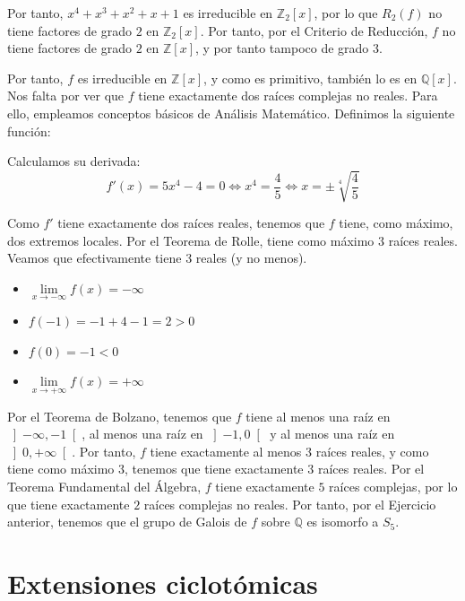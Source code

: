 \begin{ejercicio}
\begin{itemize}
        Por tanto, $x^4+x^3+x^2+x+1$ es irreducible en $\mathbb{Z}_2[x]$, por lo que $R_2(f)$ no tiene factores de grado $2$ en $\mathbb{Z}_2[x]$. Por tanto, por el Criterio de Reducción, $f$ no tiene factores de grado $2$ en $\mathbb{Z}[x]$, y por tanto tampoco de grado $3$.
    \end{itemize}

    Por tanto, $f$ es irreducible en $\mathbb{Z}[x]$, y como es primitivo, también lo es en $\mathbb{Q}[x]$. Nos falta por ver que $f$ tiene exactamente dos raíces complejas no reales. Para ello, empleamos conceptos básicos de Análisis Matemático.
    Definimos la siguiente función:

    Calculamos su derivada:
    \begin{equation*}
        f'(x) = 5x^4-4 = 0\iff x^4 = \frac{4}{5} \iff x = \pm \sqrt[4]{\frac{4}{5}}
    \end{equation*}

    Como $f'$ tiene exactamente dos raíces reales, tenemos que $f$ tiene, como máximo, dos extremos locales. Por el Teorema de Rolle, tiene como máximo $3$ raíces reales. Veamos que efectivamente tiene $3$ reales (y no menos).
    \begin{itemize}
        \item $\lim\limits_{x\to -\infty} f(x) = -\infty$
        \item $f(-1)=-1+4-1=2>0$
        \item $f(0)=-1<0$
        \item $\lim\limits_{x\to +\infty} f(x) = +\infty$
    \end{itemize}

    Por el Teorema de Bolzano, tenemos que $f$ tiene al menos una raíz en $\left]-\infty,-1\right[$, al menos una raíz en $\left]-1,0\right[$ y al menos una raíz en $\left]0,+\infty\right[$. Por tanto, $f$ tiene exactamente al menos $3$ raíces reales, y como tiene como máximo $3$, tenemos que tiene exactamente $3$ raíces reales. Por el Teorema Fundamental del Álgebra, $f$ tiene exactamente $5$ raíces complejas, por lo que tiene exactamente $2$ raíces complejas no reales. Por tanto, por el Ejercicio anterior, tenemos que el grupo de Galois de $f$ sobre $\mathbb{Q}$ es isomorfo a $S_5$.
\end{ejercicio}

\section{Extensiones ciclotómicas}

